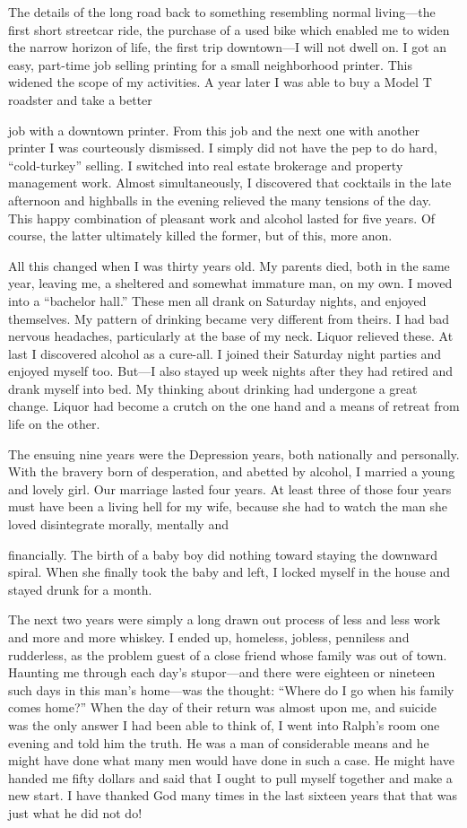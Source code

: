 \begin{biblechapter}
The details of the long road back to something resembling normal living—the first short streetcar ride, the purchase of a used bike which enabled me to widen the narrow horizon of life, the first trip downtown—I will not dwell on. I got an easy, part-time job selling printing for a small neighborhood printer. This widened the scope of my activities. A year later I was able to buy a Model T roadster and take a better

job with a downtown printer. From this job and the next one with another printer I was courteously dismissed. I simply did not have the pep to do hard, “cold-turkey” selling. I switched into real estate brokerage and property management work. Almost simultaneously, I discovered that cocktails in the late afternoon and highballs in the evening relieved the many tensions of the day. This happy combination of pleasant work and alcohol lasted for five years. Of course, the latter ultimately killed the former, but of this, more anon.

All this changed when I was thirty years old. My parents died, both in the same year, leaving me, a sheltered and somewhat immature man, on my own. I moved into a “bachelor hall.” These men all drank on Saturday nights, and enjoyed themselves. My pattern of drinking became very different from theirs. I had bad nervous headaches, particularly at the base of my neck. Liquor relieved these. At last I discovered alcohol as a cure-all. I joined their Saturday night parties and enjoyed myself too. But—I also stayed up week nights after they had retired and drank myself into bed. My thinking about drinking had undergone a great change. Liquor had become a crutch on the one hand and a means of retreat from life on the other.

The ensuing nine years were the Depression years, both nationally and personally. With the bravery born of desperation, and abetted by alcohol, I married a young and lovely girl. Our marriage lasted four years. At least three of those four years must have been a living hell for my wife, because she had to watch the man she loved disintegrate morally, mentally and

financially. The birth of a baby boy did nothing toward staying the downward spiral. When she finally took the baby and left, I locked myself in the house and stayed drunk for a month.

The next two years were simply a long drawn out process of less and less work and more and more whiskey. I ended up, homeless, jobless, penniless and rudderless, as the problem guest of a close friend whose family was out of town. Haunting me through each day’s stupor—and there were eighteen or nineteen such days in this man’s home—was the thought: “Where do I go when his family comes home?” When the day of their return was almost upon me, and suicide was the only answer I had been able to think of, I went into Ralph’s room one evening and told him the truth. He was a man of considerable means and he might have done what many men would have done in such a case. He might have handed me fifty dollars and said that I ought to pull myself together and make a new start. I have thanked God many times in the last sixteen years that that was just what he did not do!


\end{biblechapter}

